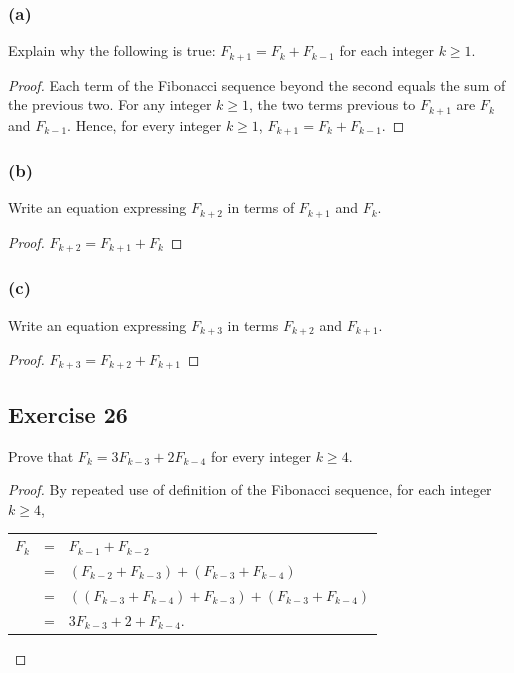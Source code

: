 \documentclass[14pt]{extarticle}
\begin{document}
\subsubsection{(a)}
Explain why the following is true: $F_{k+1} = F_k + F_{k-1}$ for each integer $k \geq 1$.

\begin{proof}
Each term of the Fibonacci sequence beyond the second equals the sum of the previous two. For any integer 
$k \geq 1$, the two terms previous to $F_{k+1}$ are $F_k$ and $F_{k-1}$. Hence, for every integer $k \geq 1$, 
$F_{k+1} = F_k + F_{k-1}$.
\end{proof}

\subsubsection{(b)}
Write an equation expressing $F_{k+2}$ in terms of $F_{k+1}$ and $F_k$.

\begin{proof}
$F_{k+2} = F_{k+1} + F_k$
\end{proof}

\subsubsection{(c)}
Write an equation expressing $F_{k+3}$ in terms $F_{k+2}$ and $F_{k+1}$.

\begin{proof}
$F_{k+3} = F_{k+2} + F_{k+1}$
\end{proof}

\subsection{Exercise 26}
Prove that $F_k = 3F_{k - 3} + 2F_{k - 4}$ for every integer $k \geq 4$.

\begin{proof}
By repeated use of definition of the Fibonacci sequence,
for each integer $k \geq 4$,

\begin{tabular}{rcl}
$F_k$ & = & $F_{k-1} + F_{k-2}$ \\
& = & $(F_{k-2} + F_{k-3}) + (F_{k-3} + F_{k-4})$ \\
& = & $((F_{k-3} + F_{k-4}) + F_{k-3}) + (F_{k-3} + F_{k-4})$ \\
& = & $3F_{k-3} + 2 + F_{k-4}$.
\end{tabular}

\end{proof}
\end{document}
